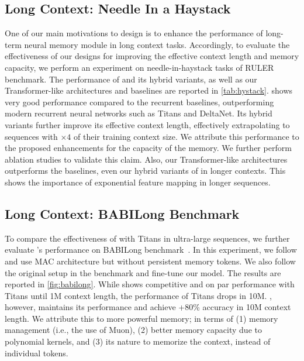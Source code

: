 \subsection{Long Context: Needle In a Haystack}\label{sec:niah}
One of our main motivations to design \model{} is to enhance the performance of long-term neural memory module in long context tasks. Accordingly, to evaluate the effectiveness of our designs for improving the effective context length and memory capacity, we perform an experiment on needle-in-haystack tasks of RULER~\citep{hsieh2024ruler} benchmark. The performance of \model{} and its hybrid variants, as well as our Transformer-like architectures and baselines are reported in \autoref{tab:hystack}. \model{} shows very good performance compared to the recurrent baselines, outperforming modern recurrent neural networks such as Titans and DeltaNet. Its hybrid variants further improve its effective context length, effectively extrapolating to sequences with $\times 4$ of their training context size. We attribute this performance to the proposed enhancements for the capacity of the memory. We further perform ablation studies to validate this claim. Also, our Transformer-like architectures outperforms the baselines, even our hybrid variants of \model{} in longer contexts. This shows the importance of exponential feature mapping in longer sequences.





\subsection{Long Context: BABILong Benchmark}\label{sec:babilong}
To compare the effectiveness of \model{} with Titans \citep{behrouz2024titans} in ultra-large sequences, we further evaluate \model's performance on BABILong benchmark~\citep{kuratov2024babilong}. In this experiment, we follow \citet{behrouz2024titans} and use MAC architecture but without persistent memory tokens. We also follow the original setup in the benchmark and fine-tune our model. The results are reported in \autoref{fig:babilong}. While \model{} shows competitive and on par performance with Titans until 1M context length, the performance of Titans drops in 10M. \model, however, maintains its performance and achieve +80\% accuracy in 10M context length. We attribute this to more powerful memory; in terms of (1) memory management (i.e., the use of Muon), (2) better memory capacity due to polynomial kernels, and (3) its nature to memorize the context, instead of individual tokens. 





